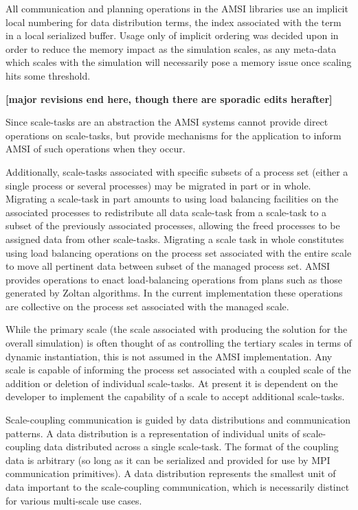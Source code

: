 \documentclass[11pt]{article}
\begin{document}
All communication and planning operations in the AMSI libraries use an implicit local numbering for data distribution terms, the index associated with the term in a local serialized buffer.
Usage only of implicit ordering was decided upon in order to reduce the memory impact as the simulation scales, as any meta-data which scales with the simulation will necessarily pose a memory issue once scaling hits some threshold.

\textbf{[major revisions end here, though there are sporadic edits herafter]}

Since scale-tasks are an abstraction the AMSI systems cannot provide direct operations on scale-tasks, but provide mechanisms for the application to inform AMSI of such operations when they occur.

Additionally, scale-tasks associated with specific subsets of a process set (either a single process or several processes) may be migrated in part or in whole. Migrating a scale-task in part amounts to using load balancing facilities on the associated processes to redistribute all data scale-task from a scale-task to a subset of the previously associated processes, allowing the freed processes to be assigned data from other scale-tasks. Migrating a scale task in whole constitutes using load balancing operations on the process set associated with the entire scale to move all pertinent data between subset of the managed process set. AMSI provides operations to enact load-balancing operations from plans such as those generated by Zoltan algorithms.  In the current implementation these operations are collective on the process set associated with the managed scale.

While the primary scale (the scale associated with producing the solution for the overall simulation) is often thought of as controlling the tertiary scales in terms of dynamic instantiation, this is not assumed in the AMSI implementation. Any scale is capable of informing the process set associated with a coupled scale of the addition or deletion of individual scale-tasks. At present it is dependent on the developer to implement the capability of a scale to accept additional scale-tasks.

Scale-coupling communication is guided by data distributions and communication patterns. A data distribution is a representation of individual units of scale-coupling data distributed across a single scale-task. The format of the coupling data is arbitrary (so long as it can be serialized and provided for use by MPI communication primitives). A data distribution represents the smallest unit of data important to the scale-coupling communication, which is necessarily distinct for various multi-scale use cases.
\end{document}
